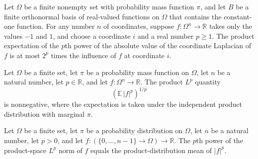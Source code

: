 \begin{theorem}
\label{FABL.FiniteFourierBasis.productMean_abs_laplacian_rpow_le_two_rpow_influence}
\leanok
{}
Let $\Omega$ be a finite nonempty set with probability mass function $\pi$, and let $B$
be a finite orthonormal basis of real-valued functions on $\Omega$ that contains the
constant-one function. For any number $n$ of coordinates, suppose $f\colon
\Omega^n\to\mathbb R$ takes only the values $-1$ and $1$, and choose a coordinate $i$
and a real number $p\ge1$. The product expectation of the $p$th power of the absolute
value of the coordinate Laplacian of $f$ is at most $2^p$ times the influence of $f$ at
coordinate $i$.
\end{theorem}

\begin{theorem}
\label{FABL.productLpNorm_nonneg}
\leanok
{}
Let $\Omega$ be a finite set, let $\pi$ be a probability mass function on $\Omega$, let
$n$ be a natural number, let $p\in\mathbb R$, and let $f:\Omega^n\to\mathbb R$. The
product $L^p$ quantity
\[
\left(\mathbb E\,|f|^p\right)^{1/p}
\]
is nonnegative, where the expectation is taken under the independent product
distribution with marginal $\pi$.
\end{theorem}

\begin{theorem}
\label{FABL.productLpNorm_rpow_eq_productMean_abs_rpow}
\leanok
{}
Let $\Omega$ be a finite set, let $\pi$ be a probability distribution on $\Omega$, let
$n$ be a natural number, let $p>0$, and let $f:(\{0,\ldots,n-1\}\to\Omega)\to\mathbb R$.
The $p$th power of the product-space $L^p$ norm of $f$ equals the product-distribution
mean of $|f|^p$.
\end{theorem}

